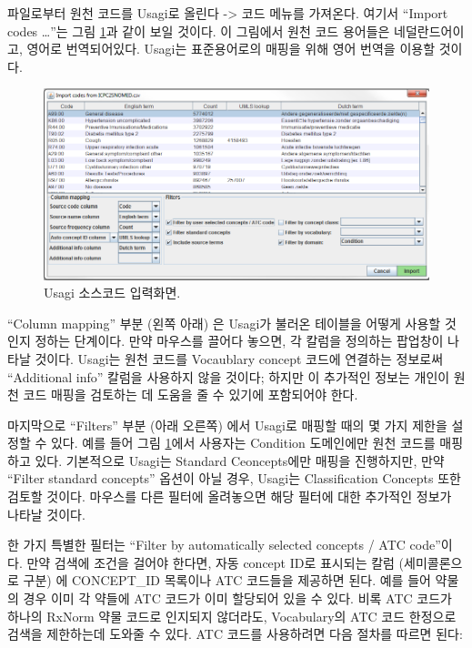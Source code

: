 \documentclass[11pt]{book}
\theoremstyle{definition}
\theoremstyle{definition}
\theoremstyle{definition}
\theoremstyle{remark}
\begin{document}
파일로부터 원천 코드를 Usagi로 올린다 -\textgreater{} 코드 메뉴를
가져온다. 여기서 ``Import codes \ldots{}''는 그림
\ref{fig:usagiImport}과 같이 보일 것이다. 이 그림에서 원천 코드 용어들은
네덜란드어이고, 영어로 번역되어있다. Usagi는 표준용어로의 매핑을 위해
영어 번역을 이용할 것이다.

\begin{figure}

{\centering \includegraphics[width=1\linewidth]{images/ExtractTransformLoad/usagiImport} 

}

\caption{Usagi 소스코드 입력화면.}\label{fig:usagiImport}
\end{figure}

``Column mapping'' 부분 (왼쪽 아래) 은 Usagi가 불러온 테이블을 어떻게
사용할 것인지 정하는 단계이다. 만약 마우스를 끌어다 놓으면, 각 칼럼을
정의하는 팝업창이 나타날 것이다. Usagi는 원천 코드를 Vocaublary concept
코드에 연결하는 정보로써 ``Additional info'' 칼럼을 사용하지 않을
것이다; 하지만 이 추가적인 정보는 개인이 원천 코드 매핑을 검토하는 데
도움을 줄 수 있기에 포함되어야 한다.

마지막으로 ``Filters'' 부분 (아래 오른쪽) 에서 Usagi로 매핑할 때의 몇
가지 제한을 설정할 수 있다. 예를 들어 그림 \ref{fig:usagiImport}에서
사용자는 Condition 도메인에만 원천 코드를 매핑하고 있다. 기본적으로
Usagi는 Standard Ceoncepts에만 매핑을 진행하지만, 만약 ``Filter standard
concepts'' 옵션이 아닐 경우, Usagi는 Classification Concepts 또한 검토할
것이다. 마우스를 다른 필터에 올려놓으면 해당 필터에 대한 추가적인 정보가
나타날 것이다.

한 가지 특별한 필터는 ``Filter by automatically selected concepts / ATC
code''이다. 만약 검색에 조건을 걸어야 한다면, 자동 concept ID로 표시되는
칼럼 (세미콜론으로 구분) 에 CONCEPT\_ID 목록이나 ATC 코드들을 제공하면
된다. 예를 들어 약물의 경우 이미 각 약들에 ATC 코드가 이미 할당되어 있을
수 있다. 비록 ATC 코드가 하나의 RxNorm 약물 코드로 인지되지 않더라도,
Vocabulary의 ATC 코드 한정으로 검색을 제한하는데 도와줄 수 있다. ATC
코드를 사용하려면 다음 절차를 따르면 된다:
\end{document}
